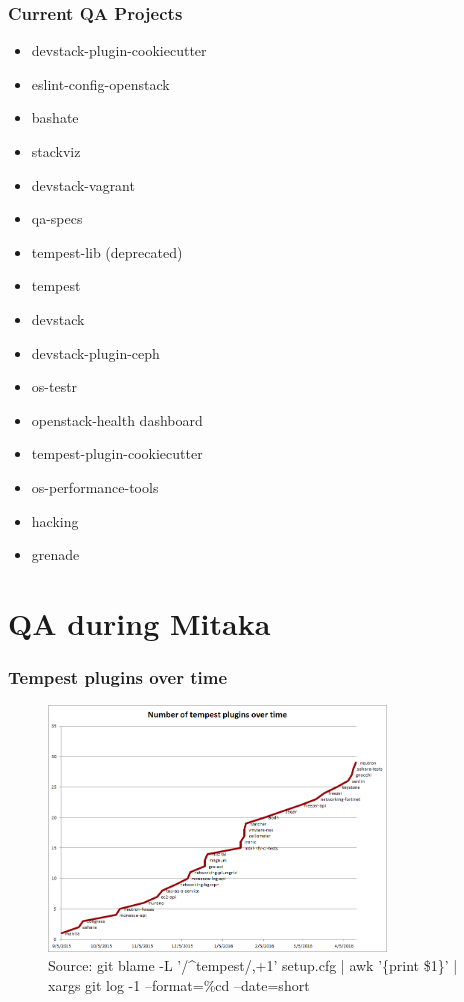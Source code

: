 \documentclass[aspectratio=169,11pt,hyperref={colorlinks=true}]{beamer}
\begin{document}
\begin{frame}
    \frametitle{Current QA Projects}
    \begin{itemize}
        \item{devstack-plugin-cookiecutter}
        \item{eslint-config-openstack}
        \item{bashate}
        \item{stackviz}
        \item{devstack-vagrant}
        \item{qa-specs}
        \item{tempest-lib (deprecated)}
        \item{tempest}
        \item{devstack}
        \item{devstack-plugin-ceph}
        \item{os-testr}
        \item{openstack-health dashboard}
        \item{tempest-plugin-cookiecutter}
        \item{os-performance-tools}
        \item{hacking}
        \item{grenade}
    \end{itemize}
\end{frame}

\section{QA during Mitaka}
\begin{frame}
    \frametitle{Tempest plugins over time}
    \begin{figure}[p]
    	\centering
    	\includegraphics[width=0.8\textwidth]{tempest-plugins.png}
        \caption{Source: git blame -L '/\^{}tempest/,+1' setup.cfg | awk '\{print \$1\}' | xargs git log -1 --format=\%cd --date=short}
    \end{figure}
\end{frame}
\end{document}
